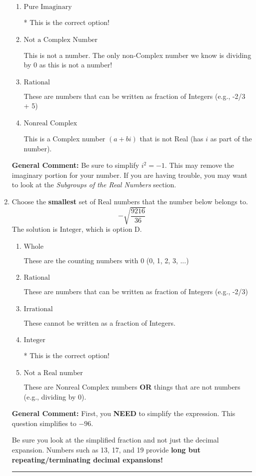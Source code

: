 \documentclass{extbook}[14pt]
\newcommand{\litem}[1]{\item #1

\rule{\textwidth}{0.4pt}}
\begin{document}
\begin{enumerate}
{\begin{enumerate}[label=\Alph*.]
These cannot be written as a fraction of Integers. Remember: $\pi$ is not an Integer!
\item \( \text{Pure Imaginary} \)

* This is the correct option!
\item \( \text{Not a Complex Number} \)

This is not a number. The only non-Complex number we know is dividing by 0 as this is not a number!
\item \( \text{Rational} \)

These are numbers that can be written as fraction of Integers (e.g., -2/3 + 5)
\item \( \text{Nonreal Complex} \)

This is a Complex number $(a+bi)$ that is not Real (has $i$ as part of the number).
\end{enumerate}

\textbf{General Comment:} Be sure to simplify $i^2 = -1$. This may remove the imaginary portion for your number. If you are having trouble, you may want to look at the \textit{Subgroups of the Real Numbers} section.
}
\litem{
Choose the \textbf{smallest} set of Real numbers that the number below belongs to.
\[ -\sqrt{\frac{9216}{36}} \]The solution is \( \text{Integer} \), which is option D.\begin{enumerate}[label=\Alph*.]
\item \( \text{Whole} \)

These are the counting numbers with 0 (0, 1, 2, 3, ...)
\item \( \text{Rational} \)

These are numbers that can be written as fraction of Integers (e.g., -2/3)
\item \( \text{Irrational} \)

These cannot be written as a fraction of Integers.
\item \( \text{Integer} \)

* This is the correct option!
\item \( \text{Not a Real number} \)

These are Nonreal Complex numbers \textbf{OR} things that are not numbers (e.g., dividing by 0).
\end{enumerate}

\textbf{General Comment:} First, you \textbf{NEED} to simplify the expression. This question simplifies to $-96$. 
 
 Be sure you look at the simplified fraction and not just the decimal expansion. Numbers such as 13, 17, and 19 provide \textbf{long but repeating/terminating decimal expansions!} 
 
}
\end{enumerate}
\end{document}

